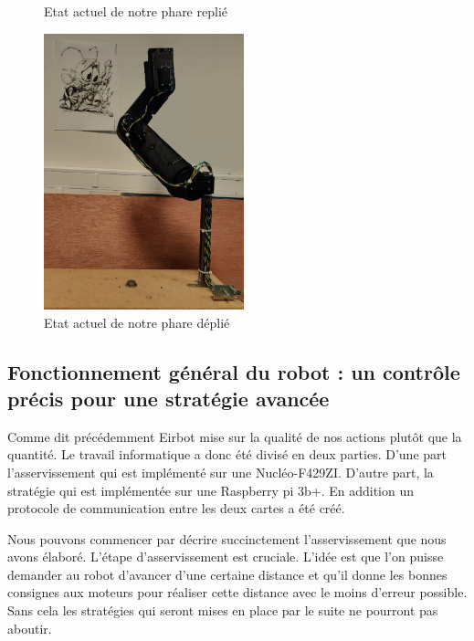 \documentclass[a4paper,10pt]{article}
\begin{document}
\begin{spacing}{1.5}
\begin{multicols}{2}
\begin{figure}[H]
  \caption{Etat actuel de notre phare replié}
\end{figure}
\columnbreak
\begin{figure}[H]
  \center
  \includegraphics[scale=0.3, height=8cm]{phare_d.png}
  \caption{Etat actuel de notre phare déplié}
\end{figure}
\end{multicols}
\subsection*{Fonctionnement général du robot : un contrôle précis pour une
  stratégie avancée}
Comme dit précédemment Eirbot mise sur la qualité de nos actions plutôt que la
quantité. Le travail informatique a donc été divisé en deux parties. D'une
part l'asservissement qui est implémenté sur une Nucléo-F429ZI. D'autre part, la
stratégie qui est implémentée sur une Raspberry pi 3b+. En addition un protocole
de communication entre les deux cartes a été créé.

Nous pouvons commencer par décrire succinctement l'asservissement que nous avons
élaboré. L'étape d'asservissement est cruciale. L'idée est que l'on puisse demander
au robot d'avancer d'une certaine distance et qu'il donne les bonnes consignes
aux moteurs pour réaliser cette distance avec le moins d'erreur possible.
Sans cela les stratégies qui seront mises en place par le suite ne pourront pas
aboutir.


\end{spacing}
\end{document}
